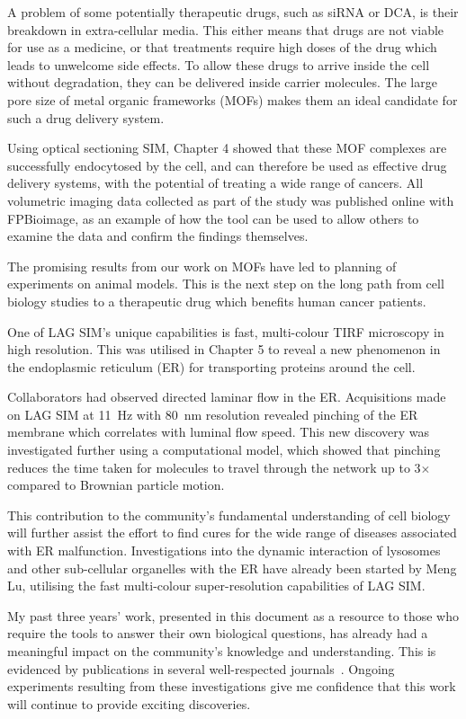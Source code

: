 A problem of some potentially therapeutic drugs, such as siRNA or DCA, is their breakdown in extra-cellular media. 
This either means that drugs are not viable for use as a medicine, or that treatments require high doses of the drug which leads to unwelcome side effects. 
To allow these drugs to arrive inside the cell without degradation, they can be delivered inside carrier molecules. 
The large pore size of metal organic frameworks (MOFs) makes them an ideal candidate for such a drug delivery system. 

Using optical sectioning SIM, Chapter 4 showed that these MOF complexes are successfully endocytosed by the cell, and can therefore be used as effective drug delivery systems, with the potential of treating a wide range of cancers. 
All volumetric imaging data collected as part of the study was published online with FPBioimage, as an example of how the tool can be used to allow others to examine the data and confirm the findings themselves. 

The promising results from our work on MOFs have led to planning of experiments on animal models. 
This is the next step on the long path from cell biology studies to a therapeutic drug which benefits human cancer patients. 

One of LAG SIM's unique capabilities is fast, multi-colour TIRF microscopy in high resolution. 
This was utilised in Chapter 5 to reveal a new phenomenon in the endoplasmic reticulum (ER) for transporting proteins around the cell. 

Collaborators had observed directed laminar flow in the ER.
Acquisitions made on LAG SIM at \SI{11}{\hertz} with \SI{80}{\nano\metre} resolution revealed pinching of the ER membrane which correlates with luminal flow speed. 
This new discovery was investigated further using a computational model, which showed that pinching reduces the time taken for molecules to travel through the network up to 3$\times$ compared to Brownian particle motion. 

This contribution to the community's fundamental understanding of cell biology will further assist the effort to find cures for the wide range of diseases associated with ER malfunction.
Investigations into the dynamic interaction of lysosomes and other sub-cellular organelles with the ER have already been started by Meng Lu, utilising the fast multi-colour super-resolution capabilities of LAG SIM. 

My past three years' work, presented in this document as a resource to those who require the tools to answer their own biological questions, has already had a meaningful impact on the community's knowledge and understanding.
This is evidenced by publications in several well-respected journals~\cite{teplensky2017temperature, fantham2017new, moghadam2018computer, holcman2018single, lautenschlager2018c}. 
Ongoing experiments resulting from these investigations give me confidence that this work will continue to provide exciting discoveries. 